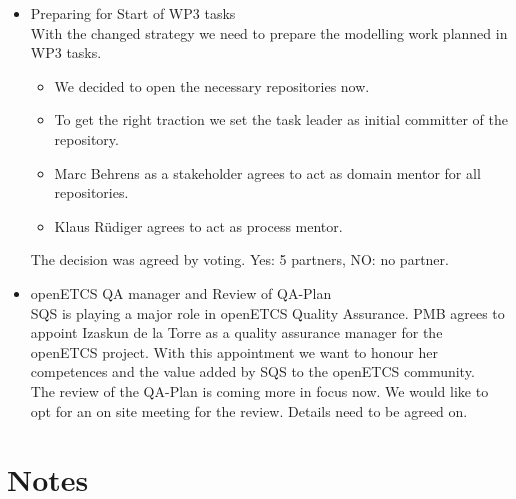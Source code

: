 \documentclass[a4paper, 11pt]{article}
\begin{document}
\begin{itemize}
\item Preparing for Start of WP3 tasks\\
With the changed strategy we need to prepare the modelling work planned in WP3 tasks.
\begin{itemize}
\item We decided to open the necessary repositories now. 
\item To get the right traction we set the task leader as initial committer of the repository. 
\item Marc Behrens as a stakeholder agrees to act as domain mentor for all repositories. 
\item Klaus R\"udiger agrees to act as process mentor.
\end{itemize}
The decision was agreed by voting. Yes: 5 partners, NO: no partner.

\item openETCS QA manager and Review of QA-Plan\\
SQS is playing a major role in openETCS Quality Assurance. 
PMB agrees to appoint Izaskun de la Torre as a quality assurance manager for the openETCS project. With this appointment we want to honour her competences and the value added by SQS to the  openETCS community.\\
The review of the QA-Plan is coming more in focus now. We would like to opt for an on site  meeting for the review. Details need to be agreed on.

\end{itemize}

\section{Notes}
\end{document}
